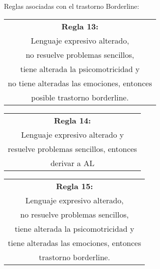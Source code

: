 \documentclass[letterpaper,12pt]{article}
\begin{document}
Reglas asociadas con el trastorno Borderline:
\begin{center}
	\begin{tabular}{|c|}
		\hline 
		\textbf{Regla 13:} \\
		Lenguaje expresivo alterado, \\
		no resuelve problemas sencillos, \\
		tiene alterada la psicomotricidad y \\
		no tiene alteradas las emociones, entonces \\
		posible trastorno borderline. \\
		\hline 
	\end{tabular} 
\end{center}

\begin{center}
	\begin{tabular}{|c|}
		\hline 
		\textbf{Regla 14:} \\
		Lenguaje expresivo alterado y\\
 		resuelve problemas sencillos, entonces\\
		derivar a AL \\
		\hline 
		\end{tabular} 
	\end{center}

\begin{center}
	\begin{tabular}{|c|}
		\hline 
		\textbf{Regla 15:} \\
		Lenguaje expresivo alterado, \\
		no resuelve problemas sencillos, \\
		tiene alterada la psicomotricidad y \\
		tiene alteradas las emociones, entonces \\
		trastorno borderline. \\
		\hline 
\end{tabular} 
\end{center}
\end{document}
